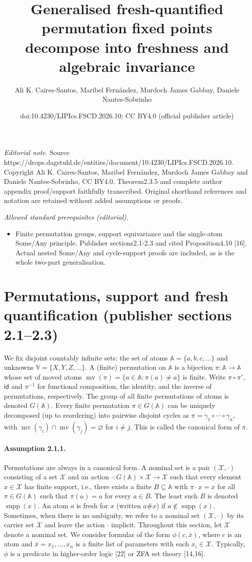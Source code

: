 \documentclass[10pt,a4paper]{amsart}
\title{Generalised fresh-quantified permutation fixed points decompose into freshness and algebraic invariance}
\author{Ali K. Caires-Santos, Maribel Fernández, Murdoch James Gabbay, Daniele Nantes-Sobrinho}
\date{doi:10.4230/LIPIcs.FSCD.2026.10; CC BY4.0 (official publisher article)}
\begin{document}
\maketitle
\noindent\textit{Editorial note.} Source https://drops.dagstuhl.de/entities/document/10.4230/LIPIcs.FSCD.2026.10. Copyright Ali K. Caires-Santos, Maribel Fernández, Murdoch James Gabbay and Daniele Nantes-Sobrinho, CC BY4.0. Theorem2.3.5 and complete author appendix proof/support faithfully transcribed. Original shorthand references and notation are retained without added assumptions or proofs.\par\medskip
\noindent\textit{Allowed standard prerequisites (editorial).}\begin{itemize}
\item Finite permutation groups, support equivariance and the single-atom Some/Any principle. Publisher sections2.1-2.3 and cited Proposition4.10 [16]. Actual nested Some/Any and cycle-support proofs are included, as is the whole two-part generalisation.
\end{itemize}\medskip
\section*{Permutations, support and fresh quantification (publisher sections 2.1--2.3)}
We fix disjoint countably infinite sets: the set of atoms $\mathbb A=\{a,b,c,\ldots\}$ and unknowns $\mathbb V=\{X,Y,Z,\ldots\}$.
A (finite) permutation on $\mathbb A$ is a bijection $\pi:\mathbb A\to\mathbb A$ whose set of moved atoms $\operatorname{mv}(\pi)=\{a\in\mathbb A:\pi(a)\ne a\}$ is finite. Write $\pi\circ\pi'$, $\mathsf{id}$ and $\pi^{-1}$ for functional composition, the identity, and the inverse of permutations, respectively.
The group of all finite permutations of atoms is denoted $G(\mathbb A)$.
Every finite permutation $\pi\in G(\mathbb A)$ can be uniquely decomposed (up to reordering) into pairwise disjoint cycles as $\pi=\gamma_1\circ\cdots\circ\gamma_n$, with $\operatorname{mv}(\gamma_i)\cap\operatorname{mv}(\gamma_j)=\varnothing$ for $i\ne j$.
This is called the canonical form of $\pi$.
\paragraph{Assumption 2.1.1.} Permutations are always in a canonical form.
A nominal set is a pair $(\mathcal X,\cdot)$ consisting of a set $\mathcal X$ and an action $\cdot:G(\mathbb A)\times\mathcal X\to\mathcal X$ such that every element $x\in\mathcal X$ has finite support, i.e., there exists a finite $B\subseteq\mathbb A$ with $\pi\cdot x=x$ for all $\pi\in G(\mathbb A)$ such that $\pi(a)=a$ for every $a\in B$.
The least such $B$ is denoted $\operatorname{supp}(x)$. An atom $a$ is fresh for $x$ (written $a\#x$) if $a\notin\operatorname{supp}(x)$.
Sometimes, when there is no ambiguity, we refer to a nominal set $(\mathcal X,\cdot)$ by its carrier set $\mathcal X$ and leave the action $\cdot$ implicit.
Throughout this section, let $\mathcal X$ denote a nominal set. We consider formulas of the form $\phi(c,\bar x)$, where $c$ is an atom and $\bar x=x_1,\ldots,x_n$ is a finite list of parameters with each $x_i\in\mathcal X$.
Typically, $\phi$ is a predicate in higher-order logic [22] or ZFA set theory [14,16].
\end{document}
